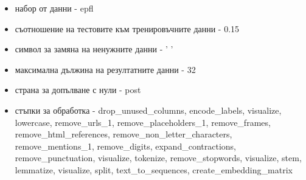 \documentclass{article}
\begin{document}
\begin{itemize}
  \begin{itemize}
    \item набор от данни - epfl
    \item съотношение на тестовите към тренировъчните данни - 0.15
    \item символ за замяна на ненужните данни - ' '
    \item максимална дължина на резултатните данни - 32
    \item страна за допълване с нули - post
    \item стъпки за обработка - drop\_unused\_columns, encode\_labels, visualize, lowercase, remove\_urls\_1,
    remove\_placeholders\_1, remove\_frames, remove\_html\_references, remove\_non\_letter\_characters,
    remove\_mentions\_1, remove\_digits, expand\_contractions, remove\_punctuation, visualize, tokenize,
    remove\_stopwords, visualize, stem, lemmatize, visualize, split, text\_to\_sequences, create\_embedding\_matrix
  \end{itemize}


\end{itemize}
\end{document}
